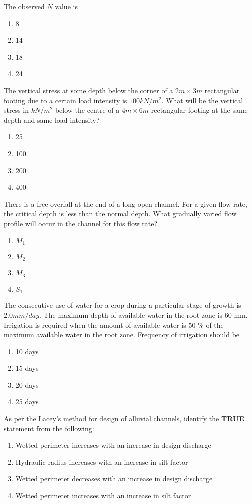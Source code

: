 	The observed $N$ value is
		\begin{enumerate}
			\item 8
			\item 14
			\item 18
			\item 24
		\end{enumerate}
	\item
	The vertical stress at some depth below the corner of a $2m \times 3m$ rectangular footing due to a certain load intensity is $100 kN/m^2$. What will be the vertical stress in $kN/m^2$ below the centre of a $4m \times 6m$ rectangular footing at the same depth and same load intensity?
		\begin{enumerate}
			\item 25
			\item 100
			\item 200
			\item 400
		\end{enumerate}
	\item
	There is a free overfall at the end of a long open channel. For a given flow rate, the critical depth is less than the normal depth. What gradually varied flow profile will occur in the channel for this flow rate?
		\begin{enumerate}
			\item $M_1$
			\item $M_2$
			\item $M_3$
			\item $S_1$
		\end{enumerate}
	\item
	The consecutive use of water for a crop during a particular stage of growth is $2.0 mm/day$. The maximum depth of available water in the root zone is 60 mm. Irrigation is required when the amount of available water is 50 \% of the maximum available water in the root zone. Frequency of irrigation should be
		\begin{enumerate}
			\item 10 days
			\item 15 days
			\item 20 days
			\item 25 days
		\end{enumerate}
	\item
	As per the Lacey's method for design of alluvial channels, identify the \textbf{TRUE} statement from the following:
		\begin{enumerate}
			\item Wetted perimeter increases with an increase in design discharge
			\item Hydraulic radius increases with an increase in silt factor
			\item Wetted perimeter decreases with an increase in design discharge
			\item Wetted perimeter increases with an increase in silt factor
		\end{enumerate}
